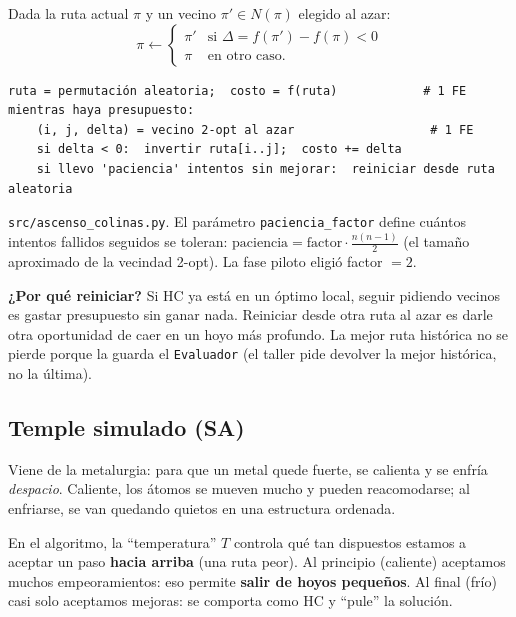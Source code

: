 \documentclass[11pt,a4paper]{article}
\newcommand{\archivo}[1]{\texttt{#1}}
\begin{document}
\begin{mate}
Dada la ruta actual $\pi$ y un vecino $\pi'\in N(\pi)$ elegido al azar:
\[
\pi \leftarrow \begin{cases} \pi' & \text{si } \Delta=f(\pi')-f(\pi)<0\\ \pi & \text{en otro caso.}\end{cases}
\]
\end{mate}

\begin{lstlisting}
ruta = permutación aleatoria;  costo = f(ruta)            # 1 FE
mientras haya presupuesto:
    (i, j, delta) = vecino 2-opt al azar                   # 1 FE
    si delta < 0:  invertir ruta[i..j];  costo += delta
    si llevo 'paciencia' intentos sin mejorar:  reiniciar desde ruta aleatoria
\end{lstlisting}

\begin{codigo}
\archivo{src/ascenso\_colinas.py}. El parámetro \texttt{paciencia\_factor} define cuántos intentos fallidos seguidos se toleran:
$\text{paciencia}=\text{factor}\cdot\frac{n(n-1)}{2}$ (el tamaño aproximado de la vecindad 2-opt). La fase piloto eligió factor $=2$.
\end{codigo}

\begin{porque}
\textbf{¿Por qué reiniciar?} Si HC ya está en un óptimo local, seguir pidiendo vecinos es gastar presupuesto sin ganar nada.
Reiniciar desde otra ruta al azar es darle otra oportunidad de caer en un hoyo más profundo. La mejor ruta histórica
no se pierde porque la guarda el \texttt{Evaluador} (el taller pide devolver la mejor histórica, no la última).
\end{porque}

\subsection{Temple simulado (SA)}
\begin{idea}
Viene de la metalurgia: para que un metal quede fuerte, se calienta y se enfría \emph{despacio}. Caliente, los átomos se mueven
mucho y pueden reacomodarse; al enfriarse, se van quedando quietos en una estructura ordenada.

En el algoritmo, la ``temperatura'' $T$ controla qué tan dispuestos estamos a aceptar un paso \textbf{hacia arriba} (una ruta peor).
Al principio (caliente) aceptamos muchos empeoramientos: eso permite \textbf{salir de hoyos pequeños}. Al final (frío) casi solo aceptamos
mejoras: se comporta como HC y ``pule'' la solución.
\end{idea}
\end{document}
